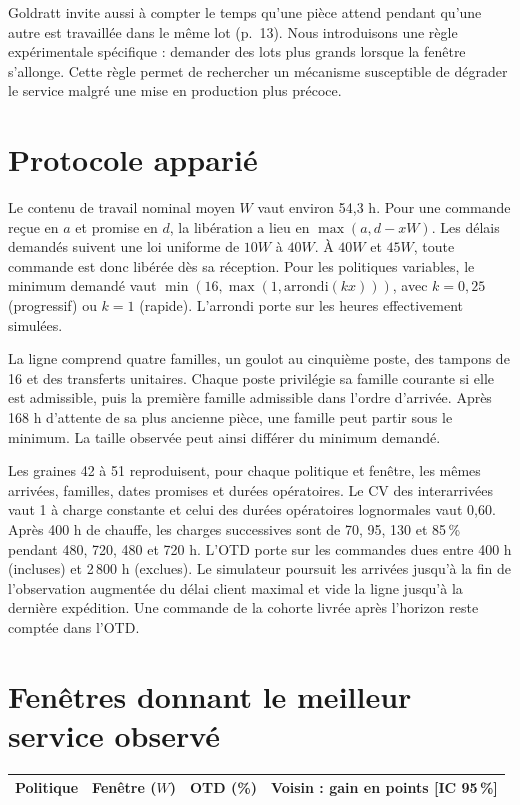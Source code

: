 \documentclass[10pt,a4paper]{article}
\begin{document}
Goldratt invite aussi à compter le temps qu'une pièce attend pendant qu'une
autre est travaillée dans le même lot (p.~13). Nous introduisons une règle
expérimentale spécifique : demander des lots plus grands lorsque la fenêtre
s'allonge. Cette règle permet de rechercher un mécanisme susceptible de dégrader
le service malgré une mise en production plus précoce.

\section*{Protocole apparié}
Le contenu de travail nominal moyen $W$ vaut environ 54,3 h. Pour une commande
reçue en $a$ et promise en $d$, la libération a lieu en $\max(a,d-xW)$.
Les délais demandés suivent une loi uniforme de $10W$ à $40W$. À $40W$ et
$45W$, toute commande est donc libérée dès sa réception. Pour les politiques
variables, le minimum demandé vaut
$\min(16,\max(1,\mathrm{arrondi}(kx)))$, avec $k=0{,}25$ (progressif) ou
$k=1$ (rapide). L'arrondi porte sur les heures effectivement simulées.

La ligne comprend quatre familles, un goulot au cinquième poste, des tampons de
16 et des transferts unitaires. Chaque poste privilégie sa famille courante si
elle est admissible, puis la première famille admissible dans l'ordre d'arrivée.
Après 168 h d'attente de sa plus ancienne pièce, une famille peut partir sous le
minimum. La taille observée peut ainsi différer du minimum demandé.

Les graines 42 à 51 reproduisent, pour chaque politique et fenêtre, les mêmes
arrivées, familles, dates promises et durées opératoires. Le CV des interarrivées
vaut 1 à charge constante et celui des durées opératoires lognormales vaut 0,60.
Après 400 h de chauffe, les charges successives sont de 70, 95, 130 et 85\,\%
pendant 480, 720, 480 et 720 h. L'OTD porte sur les commandes dues entre 400 h
(incluses) et 2\,800 h (exclues). Le simulateur poursuit les arrivées jusqu'à la
fin de l'observation augmentée du délai client maximal et vide la ligne jusqu'à
la dernière expédition. Une commande de la cohorte livrée après l'horizon reste
comptée dans l'OTD.
\newpage
\section*{Fenêtres donnant le meilleur service observé}
\small
\begin{tabular}{l l r l}\toprule
Politique & Fenêtre ($W$) & OTD (\%) & Voisin : gain en points [IC 95\,\%]\\\midrule

\end{tabular}
\normalsize
\end{document}
